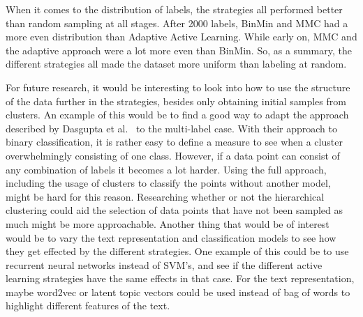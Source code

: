 When it comes to the distribution of labels, the strategies all performed better than random sampling at all stages.
After 2000 labels, BinMin and MMC had a more even distribution than Adaptive Active Learning.
While early on, MMC and the adaptive approach were a lot more even than BinMin.
So, as a summary, the different strategies all made the dataset more uniform than labeling at random.

For future research, it would be interesting to look into how to use the structure of the data further in the strategies, besides only obtaining initial samples from clusters.
An example of this would be to find a good way to adapt the approach described by Dasgupta et al\@.~\cite{dasgupta2008hierarchical} to the multi-label case.
With their approach to binary classification, it is rather easy to define a measure to see when a cluster overwhelmingly consisting of one class.
However, if a data point can consist of any combination of labels it becomes a lot harder.
Using the full approach, including the usage of clusters to classify the points without another model, might be hard for this reason.
Researching whether or not the hierarchical clustering could aid the selection of data points that have not been sampled as much might be more approachable.
Another thing that would be of interest would be to vary the text representation and classification models to see how they get effected by the different strategies.
One example of this could be to use recurrent neural networks instead of SVM's, and see if the different active learning strategies have the same effects in that case.
For the text representation, maybe word2vec or latent topic vectors could be used instead of bag of words to highlight different features of the text.